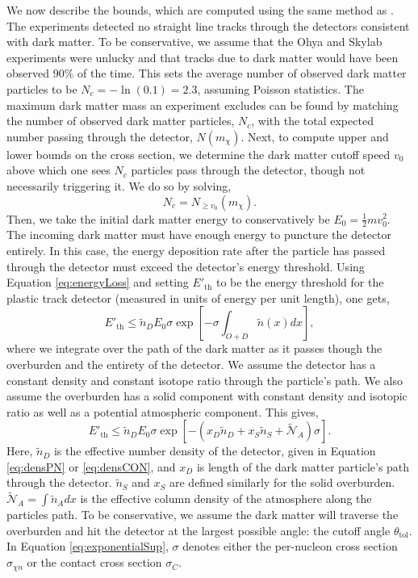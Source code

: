 \documentclass[12pt]{article}
\begin{document}
We now describe the bounds, which are computed using the same method as \cite{Bhoonah2021}. The experiments detected no straight line tracks through the detectors consistent with dark matter. To be conservative, we assume that the Ohya and Skylab experiments were unlucky and that tracks due to dark matter would have been observed 90\% of the time. This sets the average number of observed dark matter particles to be $N_c = -\ln(0.1)=2.3$, assuming Poisson statistics. The maximum dark matter mass an experiment excludes can be found by matching the number of observed dark matter particles, $N_c$, with the total expected number passing through the detector, $N(m_\chi)$. Next, to compute upper and lower bounds on the cross section, we determine the dark matter cutoff speed $v_0$ above which one sees $N_c$ particles pass through the detector, though not necessarily triggering it. We do so by solving,
\begin{equation}
    N_c = N_{\geq v_0}(m_{\chi}).
\end{equation}
Then, we take the initial dark matter energy to conservatively be $E_0=\frac{1}{2}mv_0^2$. The incoming dark matter must have enough energy to puncture the detector entirely. In this case, the energy deposition rate after the particle has passed through the detector must exceed the detector's energy threshold. Using Equation \ref{eq:energyLoss} and setting $E'_{\mathrm{th}}$ to be the energy threshold for the plastic track detector (measured in units of energy per unit length), one gets,
\begin{equation}\label{eq:enegyexponential}
    E'_{\mathrm{th}} \leq  \tilde{n}_DE_0\sigma \exp\left[-\sigma\int_{O+D} \tilde{n}(x)  dx\right],
\end{equation}
where we integrate over the path of the dark matter as it passes though the overburden and the entirety of the detector. We assume the detector has a constant density and constant isotope ratio through the particle's path. We also assume the overburden has a solid component with constant density and isotopic ratio as well as a potential atmospheric component. This gives,
\begin{equation}\label{eq:exponentialSup}
    E'_{\mathrm{th}} \leq  \tilde{n}_DE_0\sigma \exp\left[-(x_D\tilde{n}_D+x_S\tilde{n}_S+\tilde{\mathcal{N}}_A)\sigma\right].
\end{equation}
Here, $\tilde{n}_D$ is the effective number density of the detector, given in Equation \ref{eq:densPN} or \ref{eq:densCON}, and $x_D$ is length of the dark matter particle's path through the detector. $\tilde{n}_S$ and $x_S$ are defined similarly for the solid overburden. $\tilde{\mathcal{N}}_A=\int\tilde{n}_Adx$ is the effective column density of the atmosphere along the particles path. To be conservative, we assume the dark matter will traverse the overburden and hit the detector at the largest possible angle: the cutoff angle $\theta_{\mathrm{tol}}$. In Equation \ref{eq:exponentialSup}, $\sigma$ denotes either the per-nucleon cross section $\sigma_{\chi n}$ or the contact cross section $\sigma_{C}$.  
\end{document}
